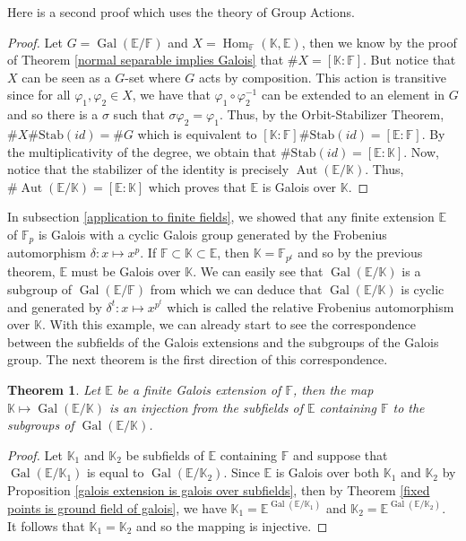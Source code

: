 \documentclass{article}
\theoremstyle{plain}
\newtheorem{theorem}{Theorem}[subsection]
\theoremstyle{definition}
\newcommand{\F}{\mathbb{F}}
\newcommand{\E}{\mathbb{E}}
\newcommand{\K}{\mathbb{K}}
\DeclareMathOperator{\Aut}{Aut}
\DeclareMathOperator{\Hom}{Hom}
\DeclareMathOperator{\Gal}{Gal}
\begin{document}
Here is a second proof which uses the theory of Group Actions.

\begin{proof}
    Let $G = \Gal(\E / \F)$ and $X = \Hom_{\F}(\K, \E)$, then we know by the proof of Theorem \ref{normal separable implies Galois} that $\#X = [\K : \F]$. But notice that $X$ can be seen as a $G$-set where $G$ acts by composition. This action is transitive since for all $\varphi_1, \varphi_2 \in X$, we have that $\varphi_1 \circ \varphi_2^{-1}$ can be extended to an element in $G$ and so there is a $\sigma$ such that $\sigma \varphi_2 = \varphi_1$. Thus, by the Orbit-Stabilizer Theorem, $\#X \# \text{Stab}(id) = \# G$ which is equivalent to $[\K : \F] \# \text{Stab}(id) = [\E : \F]$. By the multiplicativity of the degree, we obtain that $\# \text{Stab}(id) = [\E : \K]$. Now, notice that the stabilizer of the identity is precisely $\Aut(\E / \K)$. Thus, $\# \Aut(\E / \K) = [\E : \K]$ which proves that $\E$ is Galois over $\K$. 
\end{proof}

In subsection \ref{application to finite fields}, we showed that any finite extension $\E$ of $\F_p$ is Galois with a cyclic Galois group generated by the Frobenius automorphism $\delta : x \mapsto x^p$. If $\F \subset \K \subset \E$, then $\K = \F_{p^t}$ and so by the previous theorem, $\E$ must be Galois over $\K$. We can easily see that $\Gal(\E / \K)$ is a subgroup of $\Gal(\E / \F)$ from which we can deduce that $\Gal(\E / \K)$ is cyclic and generated by $\delta^t : x \mapsto x^{p^t}$ which is called the relative Frobenius automorphism over $\K$. With this example, we can already start to see the correspondence between the subfields of the Galois extensions and the subgroups of the Galois group. The next theorem is the first direction of this correspondence.

\begin{theorem}
\label{first galois correspondence}
    Let $\E$ be a finite Galois extension of $\F$, then the map $\K \mapsto \Gal(\E / \K)$ is an injection from the subfields of $\E$ containing $\F$ to the subgroups of $\Gal(\E / \K)$.
\end{theorem}

\begin{proof}
    Let $\K_1$ and $\K_2$ be subfields of $\E$ containing $\F$ and suppose that $\Gal(\E / \K_1)$ is equal to $\Gal(\E / \K_2)$. Since $\E$ is Galois over both $\K_1$ and $\K_2$ by Proposition \ref{galois extension is galois over subfields}, then by Theorem \ref{fixed points is ground field of galois}, we have $\K_1 = \E^{\Gal(\E / \K_1)}$ and $\K_2 = \E^{\Gal(\E / \K_2)}$. It follows that $\K_1 = \K_2$ and so the mapping is injective.
\end{proof}
\end{document}
